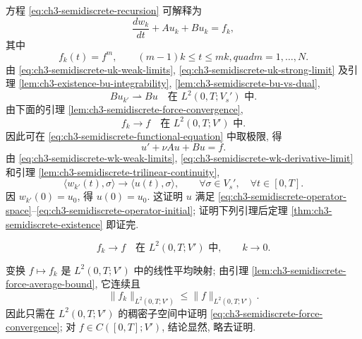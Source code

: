 \hypertarget{chapter-03-page-238}{}
方程 \eqref{eq:ch3-semidiscrete-recursion} 可解释为
\begin{equation}
\frac{dw_k}{dt}+Au_k+Bu_k=f_k,
\label{eq:ch3-semidiscrete-functional-equation}
\end{equation}
其中
\[
f_k(t)=f^m,
\qquad(m-1)k\leq t\leq mk,quad m=1,\ldots,N.
\]
由 \eqref{eq:ch3-semidiscrete-uk-weak-limits}, \eqref{eq:ch3-semidiscrete-uk-strong-limit} 及引理 \ref{lem:ch3-existence-bu-integrability}, \ref{lem:ch3-semidiscrete-bu-vs-dual},
\[
Bu_{k'}\rightharpoonup Bu\quad\text{在 }L^2(0,T;V_s')\text{ 中}.
\]
由下面的引理 \ref{lem:ch3-semidiscrete-force-convergence},
\[
f_k\longrightarrow f\quad\text{在 }L^2(0,T;V')\text{ 中}.
\]
因此可在 \eqref{eq:ch3-semidiscrete-functional-equation} 中取极限, 得
\[
u'+\nu Au+Bu=f.
\]
由 \eqref{eq:ch3-semidiscrete-wk-weak-limits}, \eqref{eq:ch3-semidiscrete-wk-derivative-limit} 和引理 \ref{lem:ch3-semidiscrete-trilinear-continuity},
\[
\langle w_{k'}(t),\sigma\rangle\longrightarrow\langle u(t),\sigma\rangle,
\qquad\forall\sigma\in V_s',\quad\forall t\in[0,T].
\]
因 $w_{k'}(0)=u_0$, 得 $u(0)=u_0$. 这证明 $u$ 满足 \eqref{eq:ch3-semidiscrete-operator-space}--\eqref{eq:ch3-semidiscrete-operator-initial}; 证明下列引理后定理 \ref{thm:ch3-semidiscrete-existence} 即证完.

\begin{Lemma}
\label{lem:ch3-semidiscrete-force-convergence}
\begin{equation}
f_k\longrightarrow f\quad\text{在 }L^2(0,T;V')\text{ 中},
\qquad k\to0.
\label{eq:ch3-semidiscrete-force-convergence}
\end{equation}
\end{Lemma}

\begin{Proof}
变换 $f\mapsto f_k$ 是 $L^2(0,T;V')$ 中的线性平均映射; 由引理 \ref{lem:ch3-semidiscrete-force-average-bound}, 它连续且
\begin{equation}
\lVert f_k\rVert_{L^2(0,T;V')}
\leq\lVert f\rVert_{L^2(0,T;V')}.
\label{eq:ch3-semidiscrete-averaging-contraction}
\end{equation}
因此只需在 $L^2(0,T;V')$ 的稠密子空间中证明 \eqref{eq:ch3-semidiscrete-force-convergence}; 对 $f\in C([0,T];V')$, 结论显然, 略去证明.
\end{Proof}

